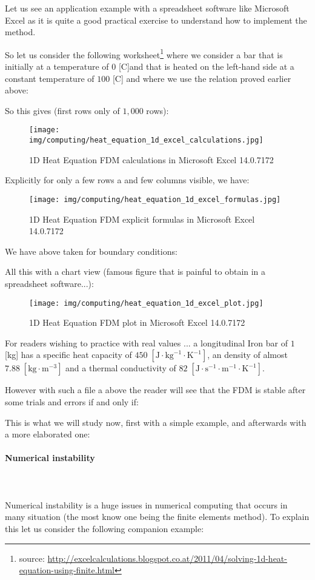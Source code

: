 	Let us see an application example with a spreadsheet software like Microsoft Excel as it is quite a good practical exercise to understand how to implement the method.
	
	So let us consider the following worksheet\footnote{source: \url{http://excelcalculations.blogspot.co.at/2011/04/solving-1d-heat-equation-using-finite.html}} where we consider a bar that is initially at a temperature of $0$ [C]and that is heated on the left-hand side at a constant temperature of $100$ [C] and where we use the relation proved earlier above:
	
	So this gives (first rows only of $1,000$ rows): 
	\begin{figure}[H]
		\centering
		\texttt{[image: img/computing/heat\_equation\_1d\_excel\_calculations.jpg]}
		\caption{1D Heat Equation FDM calculations in Microsoft Excel 14.0.7172}
	\end{figure}
	Explicitly for only a few rows a and few columns visible, we have:
	\begin{figure}[H]
		\centering
		\texttt{[image: img/computing/heat\_equation\_1d\_excel\_formulas.jpg]}
		\caption{1D Heat Equation FDM explicit formulas in Microsoft Excel 14.0.7172}
	\end{figure}
	We have above taken for boundary conditions:
	 
	
	All this with a chart view (famous figure that is painful to obtain in a spreadsheet software...):
	\begin{figure}[H]
		\centering
		\texttt{[image: img/computing/heat\_equation\_1d\_excel\_plot.jpg]}
		\caption{1D Heat Equation FDM plot in Microsoft Excel 14.0.7172}
	\end{figure}
	

	For readers wishing to practice with real values ... a longitudinal Iron bar of $1$ [kg] has a specific heat capacity of $450\;[\text{J}\cdot\text{kg}^{-1}\cdot\text{K}^{-1}]$, an density of almost $7.88\;[\text{kg}\cdot \text{m}^{-3}]$ and a thermal conductivity of $82\;[\text{J}\cdot\text{s}^{-1}\cdot\text{m}^{-1}\cdot\text{K}^{-1}]$.
	
	However with such a file a above the reader will see that the FDM is stable   after some trials and errors if and only if:
	
	This is what we will study now, first with a simple example, and afterwards with a more elaborated one:
	
	\paragraph{Numerical instability}\mbox{}\\\\
	Numerical instability is a huge issues in numerical computing that occurs in many situation (the most know one being the finite elements method). To explain this let us consider the following companion example:
	
